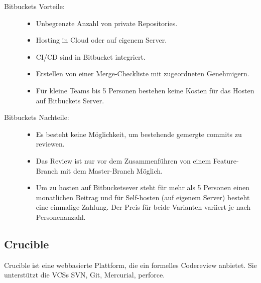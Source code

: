\begin{description}
	\item [Bitbuckets Vorteile:] \hfill
	\begin{itemize}
		\item Unbegrenzte Anzahl von private Repositories.
		\item Hosting in Cloud oder auf eigenem Server.
		\item \ac{CI}/\ac{CD} sind in Bitbucket integriert.
		\item Erstellen von einer Merge-Checkliste mit zugeordneten Genehmigern.
		\item Für kleine Teams bis 5 Personen bestehen keine Kosten für das Hosten auf Bitbuckets Server.
	\end{itemize}
	
	\item [Bitbuckets Nachteile:] \hfill
	\begin{itemize}
		\item Es besteht keine Möglichkeit, um bestehende gemergte commits zu reviewen.
		\item Das Review ist nur vor dem Zusammenführen von einem Feature-Branch mit dem Master-Branch Möglich.
		\item Um zu hosten auf Bitbucketsever steht für mehr als 5 Personen einen monatlichen Beitrag und für Self-hosten (auf eigenem Server) besteht eine einmalige Zahlung. Der 
			Preis für beide Varianten variiert je nach Personenanzahl.
	\end{itemize}
\end{description}

\subsection{Crucible}
\label{subsec:Crucible}

Crucible ist eine webbasierte Plattform, die ein formelles Codereview anbietet. Sie unterstützt die \acp{VCS} \ac{SVN}, Git, Mercurial, perforce.

